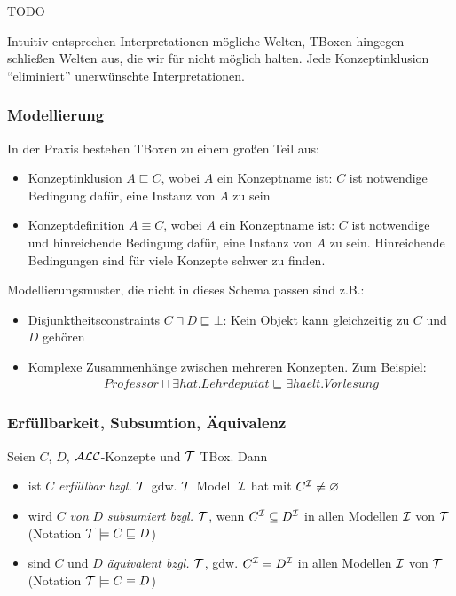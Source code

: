 \begin{tafel}
    TODO
\end{tafel}

Intuitiv entsprechen Interpretationen mögliche Welten, TBoxen hingegen schließen Welten aus, die wir für nicht möglich halten. Jede Konzeptinklusion \enquote{eliminiert} unerwünschte Interpretationen.

\subsubsection{Modellierung}\label{modellierung}

In der Praxis bestehen TBoxen zu einem großen Teil aus:

\begin{itemize}
\item Konzeptinklusion $A \sqsubseteq C$, wobei $A$ ein Konzeptname ist: $C$ ist notwendige Bedingung dafür, eine Instanz von $A$ zu sein
\item Konzeptdefinition $A \equiv C$, wobei $A$ ein Konzeptname ist: $C$ ist notwendige und hinreichende Bedingung dafür, eine Instanz von $A$ zu sein.
    Hinreichende Bedingungen sind für viele Konzepte schwer zu finden.
    \end{itemize}
Modellierungsmuster, die nicht in dieses Schema passen sind z.B.:
\begin{itemize}
\item Disjunktheitsconstraints $C \sqcap D \sqsubseteq \bot$: Kein Objekt kann gleichzeitig zu $C$ und $D$ gehören
\item Komplexe Zusammenhänge zwischen mehreren Konzepten. Zum Beispiel:
    \begin{align*}
        \mathit{Professor} \sqcap \exists \mathit{hat}.\mathit{Lehrdeputat} \sqsubseteq \exists \mathit{haelt}.\mathit{Vorlesung}
    \end{align*}
\end{itemize}

\subsubsection{Erfüllbarkeit, Subsumtion, Äquivalenz}
\label{sec:tbox-erfuellbarkeit}
\label{erfuxfcllbarkeit-subsumtion-uxe4quivalenz-1}

\begin{definition} 
Seien $C$, $D$, $\mathcal{A}\mathcal{L}\mathcal{C}$-Konzepte und $\mathcal{T}$ TBox. Dann

\begin{itemize}
  \item ist $C$ \emph{erfüllbar bzgl.} $\mathcal{T}$ gdw. $\mathcal{T}$ Modell $\mathcal{I}$ hat mit $C^{\mathcal{I}} \neq \varnothing$
  \item wird $C$ \emph{von} $D$ \emph{subsumiert bzgl.} $\mathcal{T}$, wenn $C^{\mathcal{I}} \subseteq D^{\mathcal{I}}$ in allen Modellen $\mathcal{I}$ von $\mathcal{T}$ (Notation $\mathcal{T} \models C \sqsubseteq D$)
  \item sind $C$ und $D$ \emph{äquivalent bzgl.} $\mathcal{T}$, gdw. $C^{\mathcal{I}} = D^{\mathcal{I}}$ in allen Modellen $\mathcal{I}$ von $\mathcal{T}$ (Notation $\mathcal{T} \models C \equiv D$)
\end{itemize}
\end{definition}


